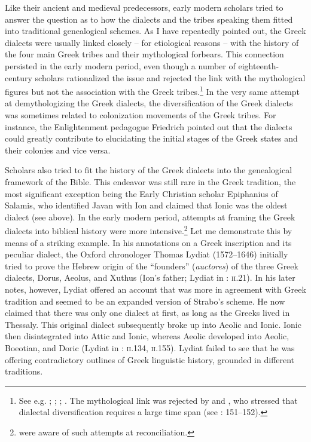 Like their ancient and medieval predecessors, early modern scholars tried to answer the question as to how the dialects and the tribes speaking them fitted into traditional genealogical schemes. As I have repeatedly pointed out, the Greek dialects were usually linked closely – for etiological reasons – with the history of the four main Greek tribes and their mythological forbears. This connection persisted in the early modern period, even though a number of eighteenth-century scholars rationalized the issue and rejected the link with the mythological figures but not the association with the Greek tribes.\footnote{See e.g. \citet[3--4]{Walper1589}; \citet[166--167]{Labbe1639}; \citet[73]{Vitringa1689}; \citet[\textsc{xxiiii–xxvi}]{Harles1778}. The mythological link was rejected by \citet[\textsc{c.4}\textsc{\textsuperscript{v}}\textsc{–d.1}\textsc{\textsuperscript{r}}]{Thryllitsch1709} and \citet[108--110]{Hemsterhuis2015}, who stressed that dialectal diversification requires a large time span (see \citealt{Gerretzen1940}: 151–152).} In the very same attempt at demythologizing the Greek dialects, the diversification of the Greek dialects was sometimes related to colonization movements of the Greek tribes. For instance, the Enlightenment pedagogue Friedrich \citet[12]{Gedike1782} pointed out that the dialects could greatly contribute to elucidating the initial stages of the Greek states and their colonies and vice versa.

Scholars also tried to fit the history of the Greek dialects into the genealogical framework of the Bible. This endeavor was still rare in the Greek tradition, the most significant exception being the Early Christian scholar Epiphanius of Salamis, who identified Javan with Ion and claimed that Ionic was the oldest dialect (see  above). In the early modern period, attempts at framing the Greek dialects into biblical history were more intensive.\footnote{\citet[\textsc{c.1}\textsc{\textsuperscript{v}}]{Schwartz1702} were aware of such attempts at reconciliation.} Let me demonstrate this by means of a striking example. In his annotations on a Greek inscription and its peculiar dialect, the Oxford chronologer Thomas Lydiat (1572–1646) initially tried to prove the Hebrew origin of the “founders” (\textit{auctores}) of the three Greek dialects, Dorus, Aeolus, and Xuthus (Ion’s father; Lydiat in \citealt{Prideaux1676}: \textsc{ii}.21). In his later notes, however, Lydiat offered an account that was more in agreement with Greek tradition and seemed to be an expanded version of Strabo’s scheme. He now claimed that there was only one dialect at first, as long as the Greeks lived in Thessaly. This original dialect subsequently broke up into Aeolic and Ionic. Ionic then disintegrated into Attic and Ionic, whereas Aeolic developed into Aeolic, Boeotian, and Doric (Lydiat in \citealt{Prideaux1676}: \textsc{ii.134}, \textsc{ii.}155). Lydiat failed to see that he was offering contradictory outlines of Greek linguistic history, grounded in different traditions.

